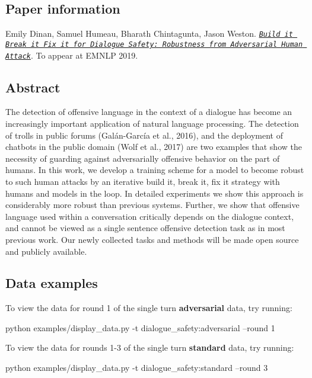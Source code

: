 \subsection*{Paper information}

Emily Dinan, Samuel Humeau, Bharath Chintagunta, Jason Weston. {\itshape \href{https://arxiv.org/abs/1908.06083}{\tt Build it Break it Fix it for Dialogue Safety\+: Robustness from Adversarial Human Attack}}. To appear at E\+M\+N\+LP 2019.



\subsection*{Abstract}

The detection of offensive language in the context of a dialogue has become an increasingly important application of natural language processing. The detection of trolls in public forums (Galán-\/\+García et al., 2016), and the deployment of chatbots in the public domain (Wolf et al., 2017) are two examples that show the necessity of guarding against adversarially offensive behavior on the part of humans. In this work, we develop a training scheme for a model to become robust to such human attacks by an iterative build it, break it, fix it strategy with humans and models in the loop. In detailed experiments we show this approach is considerably more robust than previous systems. Further, we show that offensive language used within a conversation critically depends on the dialogue context, and cannot be viewed as a single sentence offensive detection task as in most previous work. Our newly collected tasks and methods will be made open source and publicly available.

\subsection*{Data examples}

To view the data for round 1 of the single turn {\bfseries adversarial} data, try running\+: 
\begin{DoxyCode}
python examples/display\_data.py -t dialogue\_safety:adversarial --round 1
\end{DoxyCode}


To view the data for rounds 1-\/3 of the single turn {\bfseries standard} data, try running\+: 
\begin{DoxyCode}
python examples/display\_data.py -t dialogue\_safety:standard --round 3
\end{DoxyCode}


